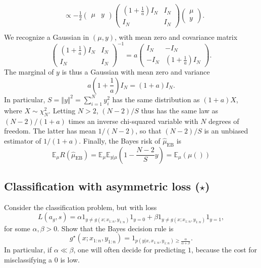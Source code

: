 \documentclass{article}
\begin{document}
{\begin{enumerate}
\begin{align*}
    & \propto -\frac12 \begin{pmatrix} \mu & y \end{pmatrix}  \begin{pmatrix} (1+\frac1a)I_N & I_N\\ I_N & I_N \end{pmatrix} \begin{pmatrix} \mu \\ y\end{pmatrix}.\\
  \end{align*}  
  We recognize a Gaussian in $(\mu,y)$, with mean zero and covariance matrix 
  $$
  \begin{pmatrix} (1+\frac1a)I_N & I_N\\ I_N & I_N \end{pmatrix}^{-1} = a \begin{pmatrix} I_N & -I_N\\ -I_N & (1+\frac1a)I_N \end{pmatrix}.
  $$
  The marginal of $y$ is thus a Gaussian with mean zero and variance 
  $$
  a\left(1+\frac1a\right )I_N = (1+a)I_N.
  $$
  In particular, $S=\Vert y\Vert^2 = \sum_{i=1}^N y_i^2$ has the same distribution as  $(1+a)X$, where $X\sim\chi^2_N$.
  Letting $N>2$, $(N-2)/S$ thus has the same law as $(N-2)/(1+a)$ times an inverse chi-squared variable with $N$ degrees of freedom. 
  The latter has mean $1/(N-2)$, so that $(N-2)/S$ is an unbiased estimator of $1/(1+a)$.
  Finally, the Bayes risk of $\hat\mu_\text{EB}$ is
  $$
  \mathbb{E}_\mu R(\hat\mu_{\text{EB}}) = \mathbb{E}_\mu\mathbb{E}_{y\vert\mu} \left( 1-\frac{N-2}{S} y\right ) =  \mathbb{E}_\mu( \mu ())
  $$
\end{enumerate}
}

\subsection{Classification with asymmetric loss ($\star$)}
Consider the classification problem, but with loss
$$
L(a_g,s) = \alpha 1_{y\neq g(x; x_{1:n}, y_{1:n})} 1_{y=0} + \beta 1_{y\neq g(x; x_{1:n}, y_{1:n})} 1_{y=1},
$$
for some $\alpha,\beta>0$.
Show that the Bayes decision rule is
$$ g^\star(x; x_{1:n}, y_{1:n}) = 1_{p(y\vert x, x_{1:n}, y_{1:n}) \geq \frac{\alpha}{\alpha+\beta}}.$$
In particular, if $\alpha\ll\beta$, one will often decide for predicting $1$, because the cost for misclassifying a 0 is low.
\end{document}
